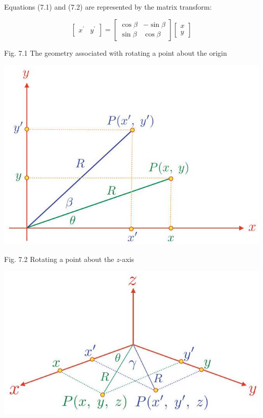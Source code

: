 \documentclass[10pt]{article}
\begin{document}
Equations (7.1) and (7.2) are represented by the matrix transform:

$$
\left[\begin{array}{ll}
x^{\prime} & y^{\prime}
\end{array}\right]=\left[\begin{array}{cc}
\cos \beta & -\sin \beta \\
\sin \beta & \cos \beta
\end{array}\right]\left[\begin{array}{l}
x \\
y
\end{array}\right]
$$

Fig. 7.1 The geometry associated with rotating a point about the origin

\begin{center}
\includegraphics[max width=\textwidth]{2023_04_20_41f1ceac5a31dc7d1b59g-115}
\end{center}

Fig. 7.2 Rotating a point about the $z$-axis

\begin{center}
\includegraphics[max width=\textwidth]{2023_04_20_41f1ceac5a31dc7d1b59g-116}
\end{center}
\end{document}
